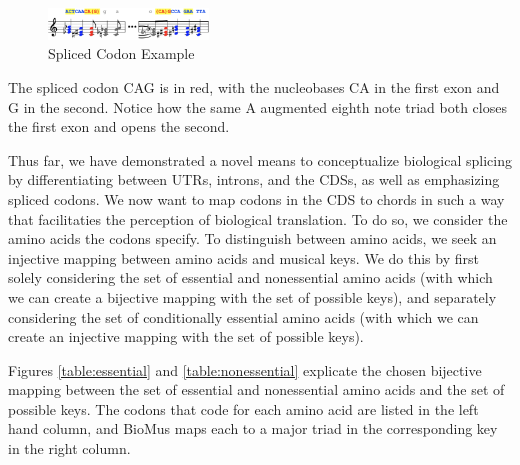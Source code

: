 \documentclass[letterpaper]{article}
\begin{document}
\begin{figure}[h!]
\centering
\includegraphics[width=0.38\textwidth]{images/splice_site_example}
  \caption{Spliced Codon Example}
  \label{fig:splice_site_example}
  \vspace{-3mm}
\end{figure}

The spliced codon CAG is in red, with the nucleobases CA in the first exon and G in the second. Notice how the same A augmented eighth note triad both closes the first exon and opens the second.

Thus far, we have demonstrated a novel means to conceptualize biological splicing by differentiating between UTRs, introns, and the CDSs, as well as emphasizing spliced codons. We now want to map codons in the CDS to chords in such a way that facilitaties the perception of biological translation. To do so,
we consider the amino acids the codons specify. To distinguish between amino acids, we seek an injective mapping between amino acids and musical keys. We do this by first solely considering the set of essential and nonessential amino acids (with which we can create a bijective mapping with the set of possible keys), and separately considering the set of conditionally essential amino acids (with which we can create an injective mapping with the set of possible keys).

Figures \ref{table:essential} and \ref{table:nonessential} explicate the chosen bijective mapping between the set of essential and nonessential amino acids and the set of possible keys. The codons that code for each amino acid are listed in the left hand column, and BioMus maps each to a major triad in the corresponding key in the right column. 
\end{document}
